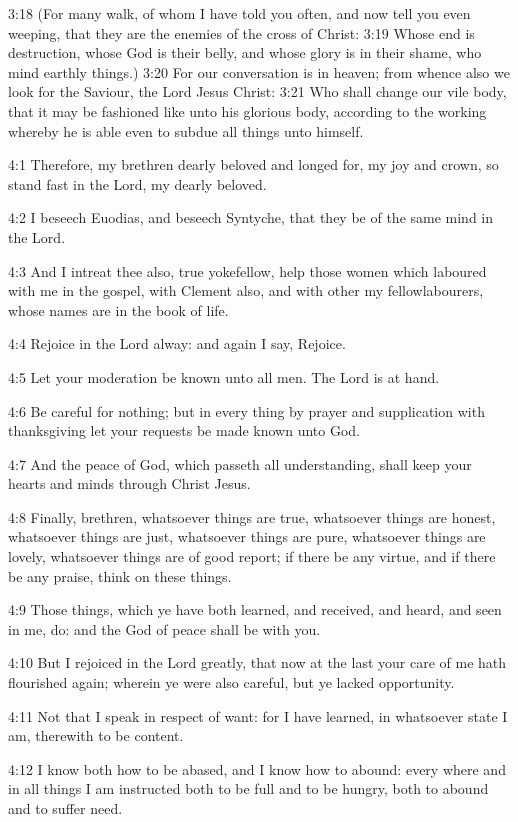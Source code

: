 3:18 (For many walk, of whom I have told you often, and now tell you
even weeping, that they are the enemies of the cross of Christ: 3:19
Whose end is destruction, whose God is their belly, and whose glory is
in their shame, who mind earthly things.)  3:20 For our conversation
is in heaven; from whence also we look for the Saviour, the Lord Jesus
Christ: 3:21 Who shall change our vile body, that it may be fashioned
like unto his glorious body, according to the working whereby he is
able even to subdue all things unto himself.

4:1 Therefore, my brethren dearly beloved and longed for, my joy and
crown, so stand fast in the Lord, my dearly beloved.

4:2 I beseech Euodias, and beseech Syntyche, that they be of the same
mind in the Lord.

4:3 And I intreat thee also, true yokefellow, help those women which
laboured with me in the gospel, with Clement also, and with other my
fellowlabourers, whose names are in the book of life.

4:4 Rejoice in the Lord alway: and again I say, Rejoice.

4:5 Let your moderation be known unto all men. The Lord is at hand.

4:6 Be careful for nothing; but in every thing by prayer and
supplication with thanksgiving let your requests be made known unto
God.

4:7 And the peace of God, which passeth all understanding, shall keep
your hearts and minds through Christ Jesus.

4:8 Finally, brethren, whatsoever things are true, whatsoever things
are honest, whatsoever things are just, whatsoever things are pure,
whatsoever things are lovely, whatsoever things are of good report; if
there be any virtue, and if there be any praise, think on these
things.

4:9 Those things, which ye have both learned, and received, and heard,
and seen in me, do: and the God of peace shall be with you.

4:10 But I rejoiced in the Lord greatly, that now at the last your
care of me hath flourished again; wherein ye were also careful, but ye
lacked opportunity.

4:11 Not that I speak in respect of want: for I have learned, in
whatsoever state I am, therewith to be content.

4:12 I know both how to be abased, and I know how to abound: every
where and in all things I am instructed both to be full and to be
hungry, both to abound and to suffer need.

